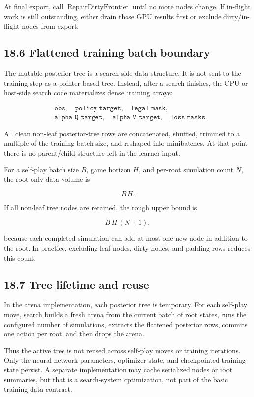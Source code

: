 \documentclass[11pt]{article}
\newcommand{\RepairDirtyFrontier}{\operatorname{RepairDirtyFrontier}}
\begin{document}
At final export, call \(\RepairDirtyFrontier\) until no more nodes change. If
in-flight work is still outstanding, either drain those GPU results first or
exclude dirty/in-flight nodes from export.

\subsection*{18.6 Flattened training batch boundary}

The mutable posterior tree is a search-side data structure. It is not sent to the
training step as a pointer-based tree. Instead, after a search finishes, the CPU
or host-side search code materializes dense training arrays:

\[
\begin{aligned}
&\texttt{obs},
\quad \texttt{policy\_target},
\quad \texttt{legal\_mask},\\
&\texttt{alpha\_Q\_target},
\quad \texttt{alpha\_V\_target},
\quad \texttt{loss\_masks}.
\end{aligned}
\]

All clean non-leaf posterior-tree rows are concatenated, shuffled, trimmed to a
multiple of the training batch size, and reshaped into minibatches. At that
point there is no parent/child structure left in the learner input.

For a self-play batch size \(B\), game horizon \(H\), and per-root simulation
count \(N\), the root-only data volume is

\[
B\,H.
\]

If all non-leaf tree nodes are retained, the rough upper bound is

\[
B\,H\,(N+1),
\]

because each completed simulation can add at most one new node in addition to the
root. In practice, excluding leaf nodes, dirty nodes, and padding rows reduces
this count.

\subsection*{18.7 Tree lifetime and reuse}

In the arena implementation, each posterior tree is temporary. For each self-play
move, search builds a fresh arena from the current batch of root states, runs the
configured number of simulations, extracts the flattened posterior rows, commits
one action per root, and then drops the arena.

Thus the active tree is not reused across self-play moves or training
iterations. Only the neural network parameters, optimizer state, and checkpointed
training state persist. A separate implementation may cache serialized nodes or
root summaries, but that is a search-system optimization, not part of the basic
training-data contract.
\end{document}
